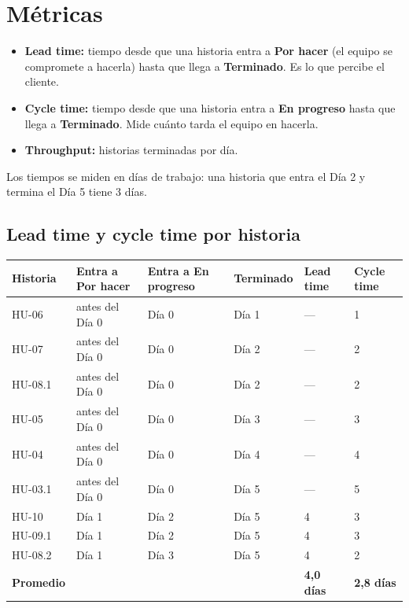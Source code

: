 \documentclass[11pt,a4paper]{article}
\begin{document}
\section{Métricas}\label{sec:metricas}

\begin{itemize}
  \item \textbf{Lead time:} tiempo desde que una historia entra a \textbf{Por hacer} (el equipo se compromete a hacerla) hasta que llega a \textbf{Terminado}. Es lo que percibe el cliente.
  \item \textbf{Cycle time:} tiempo desde que una historia entra a \textbf{En progreso} hasta que llega a \textbf{Terminado}. Mide cuánto tarda el equipo en hacerla.
  \item \textbf{Throughput:} historias terminadas por día.
\end{itemize}

Los tiempos se miden en días de trabajo: una historia que entra el Día 2 y termina el Día 5 tiene 3 días.

\subsection{Lead time y cycle time por historia}

\begin{center}
\small
\begin{tabular}{L{1.8cm} L{2.8cm} L{2.8cm} L{1.8cm} C{1.6cm} C{1.6cm}}
\toprule
\textbf{Historia} & \textbf{Entra a Por hacer} & \textbf{Entra a En progreso} & \textbf{Terminado} & \textbf{Lead time} & \textbf{Cycle time} \\
\midrule
HU-06 & antes del Día 0 & Día 0 & Día 1 & --- & 1 \\
HU-07 & antes del Día 0 & Día 0 & Día 2 & --- & 2 \\
HU-08.1 & antes del Día 0 & Día 0 & Día 2 & --- & 2 \\
HU-05 & antes del Día 0 & Día 0 & Día 3 & --- & 3 \\
HU-04 & antes del Día 0 & Día 0 & Día 4 & --- & 4 \\
HU-03.1 & antes del Día 0 & Día 0 & Día 5 & --- & 5 \\
HU-10 & Día 1 & Día 2 & Día 5 & 4 & 3 \\
HU-09.1 & Día 1 & Día 2 & Día 5 & 4 & 3 \\
HU-08.2 & Día 1 & Día 3 & Día 5 & 4 & 2 \\
\midrule
{}\textbf{Promedio} & & & & \textbf{4,0 días} & \textbf{2,8 días} \\
\bottomrule
\end{tabular}
\end{center}
\end{document}
